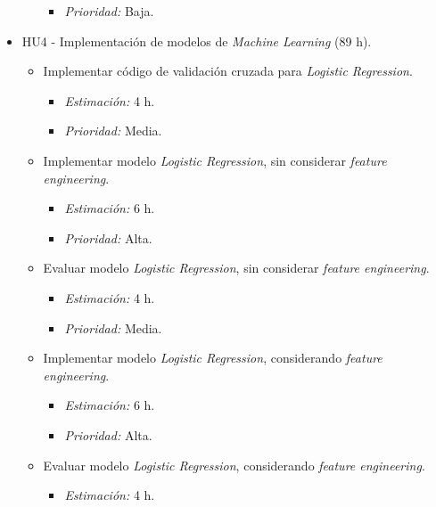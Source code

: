 \documentclass[
11pt, %
]{charter}
\begin{document}
\begin{itemize}
\begin{itemize}
\begin{itemize}
                    \item \textit{Prioridad:} Baja.
                \end{itemize}
        \end{itemize}
    \item HU4 - Implementación de modelos de \textit{Machine Learning} (89 h).
        \begin{itemize}
            \item Implementar código de validación cruzada para \textit{Logistic Regression}.
                \begin{itemize}
                    \item \textit{Estimación:} 4 h.
                    \item \textit{Prioridad:} Media.
                \end{itemize}
            \item Implementar modelo \textit{Logistic Regression}, sin considerar \textit{feature engineering}.
                \begin{itemize}
                    \item \textit{Estimación:} 6 h.
                    \item \textit{Prioridad:} Alta.
                \end{itemize}
            \item Evaluar modelo \textit{Logistic Regression}, sin considerar \textit{feature engineering}.
                \begin{itemize}
                    \item \textit{Estimación:} 4 h.
                    \item \textit{Prioridad:} Media.
                \end{itemize}
            \item Implementar modelo \textit{Logistic Regression}, considerando \textit{feature engineering}.
                \begin{itemize}
                    \item \textit{Estimación:} 6 h.
                    \item \textit{Prioridad:} Alta.
                \end{itemize}
            \item Evaluar modelo \textit{Logistic Regression}, considerando \textit{feature engineering}.
                \begin{itemize}
                    \item \textit{Estimación:} 4 h.

\end{itemize}
\end{itemize}
\end{itemize}
\end{document}

